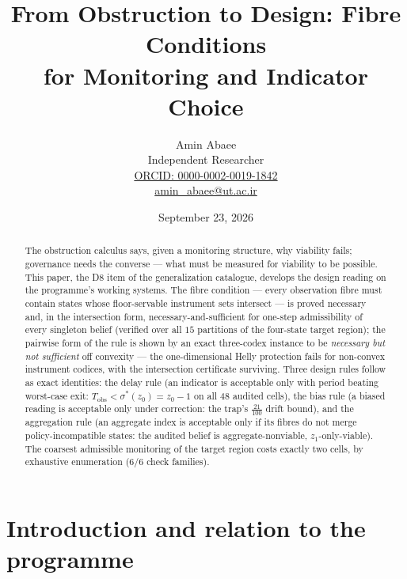 \documentclass[10pt,twocolumn]{article}
\theoremstyle{definition}
\begin{document}
\title{From Obstruction to Design: Fibre Conditions\\ for Monitoring and Indicator Choice}
\author{Amin Abaee\\[0.35em]
{\small Independent Researcher}\\[0.55em]
{\small\href{https://orcid.org/0000-0002-0019-1842}{ORCID: 0000-0002-0019-1842}}\\[0.3em]
{\small\href{mailto:amin\_abaee@ut.ac.ir}{amin\_abaee@ut.ac.ir}}}
\date{September 23, 2026}
\maketitle

\begin{abstract}
The obstruction calculus says, given a monitoring structure, why viability
fails; governance needs the converse --- what must be measured for viability
to be possible. This paper, the D8 item of the generalization catalogue,
develops the design reading on the programme's working systems. The fibre
condition --- every observation fibre must contain states whose
floor-servable instrument sets intersect --- is proved necessary and, in the
intersection form, necessary-and-sufficient for one-step admissibility of
every singleton belief (verified over all $15$ partitions of the four-state
target region); the pairwise form of the rule is shown by an exact
three-codex instance to be \emph{necessary but not sufficient} off
convexity --- the one-dimensional Helly protection fails for non-convex
instrument codices, with the intersection certificate surviving. Three
design rules follow as exact identities: the delay rule (an indicator is
acceptable only with period beating worst-case exit:
$T_{\mathrm{obs}}<\sigma^\ast(z_0)=z_0-1$ on all $48$ audited cells), the
bias rule (a biased reading is acceptable only under correction: the trap's
$\tfrac{21}{100}$ drift bound), and the aggregation rule (an aggregate index
is acceptable only if its fibres do not merge policy-incompatible states:
the audited belief is aggregate-nonviable, $z_1$-only-viable). The coarsest
admissible monitoring of the target region costs exactly two cells, by
exhaustive enumeration (6/6 check families).
\end{abstract}

\section{Introduction and relation to the programme}
\end{document}
